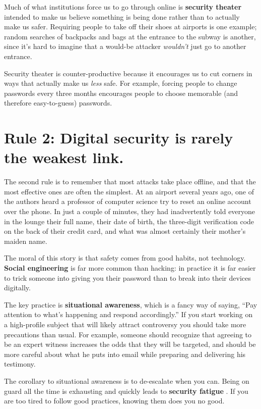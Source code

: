 \documentclass[10pt, letterpaper]{article}
\begin{document}
Much of what institutions force us to go through online is \textbf{security
theater} intended to make us believe something is being done rather than to
actually make us safer. Requiring people to take off their shoes at airports is
one example; random searches of backpacks and bags at the entrance to the subway
is another, since it's hard to imagine that a would-be attacker \emph{wouldn't}
just go to another entrance.

Security theater is counter-productive because it encourages us to cut corners
in ways that actually make us \emph{less} safe. For example, forcing people to
change passwords every three months encourages people to choose memorable (and
therefore easy-to-guess) passwords.

\section*{Rule 2: Digital security is rarely the weakest link.}

The second rule is to remember that most attacks take place offline, and that
the most effective ones are often the simplest. At an airport several years ago,
one of the authors heard a professor of computer science try to reset an online account
over the phone. In just a couple of minutes, they had inadvertently told
everyone in the lounge their full name, their date of birth, the three-digit
verification code on the back of their credit card, and what was almost
certainly their mother's maiden name.

The moral of this story is that safety comes from good habits, not
technology. \textbf{Social engineering} is far more common than hacking: in
practice it is far easier to trick someone into giving you their password than
to break into their devices digitally.

The key practice is \textbf{situational awareness}, which is a fancy way of
saying, ``Pay attention to what's happening and respond accordingly.'' If you
start working on a high-profile subject that will likely attract controversy you
should take more precautions than usual. For example, someone should recognize
that agreeing to be an expert witness increases the odds that they will be
targeted, and should be more careful about what he puts into email while
preparing and delivering his testimony.

The corollary to situational awareness is to de-escalate when you can.  Being on
guard all the time is exhausting and quickly leads to \textbf{security fatigue}
\cite{Stan2016}. If you are too tired to follow good practices, knowing them does
you no good.
\end{document}
